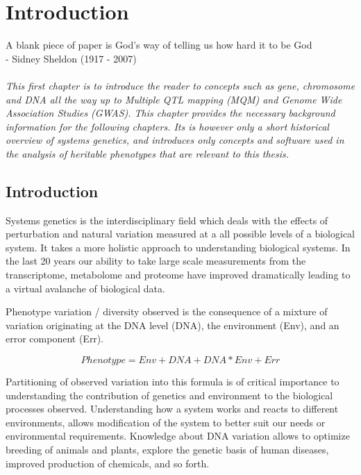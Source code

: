 \chapter{Introduction}
\thispagestyle{empty}
\label{chap:introduction}
A blank piece of paper is God's way of telling us how hard it to be God\\
- Sidney Sheldon (1917 - 2007)\\\\

\emph{This first chapter is to introduce the reader to concepts such as gene, chromosome 
and DNA all the way up to Multiple QTL mapping (MQM) and Genome Wide Association Studies 
(GWAS). This chapter provides the necessary background information for the following 
chapters. Its is however only a short historical overview of systems genetics, and 
introduces only concepts and software used in the analysis of heritable phenotypes that 
are relevant to this thesis. }

\null
\vfill
\newpage

\section{Introduction}
Systems genetics is the interdisciplinary field which deals with the effects of perturbation 
and natural variation measured at a all possible levels of a biological system. It takes a 
more holistic approach to understanding biological systems. In the last 20 years our ability 
to take large scale measurements from the transcriptome, metabolome and proteome have 
improved dramatically leading to a virtual avalanche of biological data.

Phenotype variation / diversity observed is the consequence of a mixture of variation 
originating at the DNA level (DNA), the environment (Env), and an error component (Err).

$$ Phenotype = Env + DNA + DNA * Env + Err $$

Partitioning of observed variation into this formula is of critical importance 
to understanding the contribution of genetics and environment to the biological 
processes observed. Understanding how a system works and reacts to different 
environments, allows modification of the system to better suit our needs or 
environmental requirements. Knowledge about DNA variation allows to optimize 
breeding of animals and plants, explore the genetic basis of human diseases, 
improved production of chemicals, and so forth.

